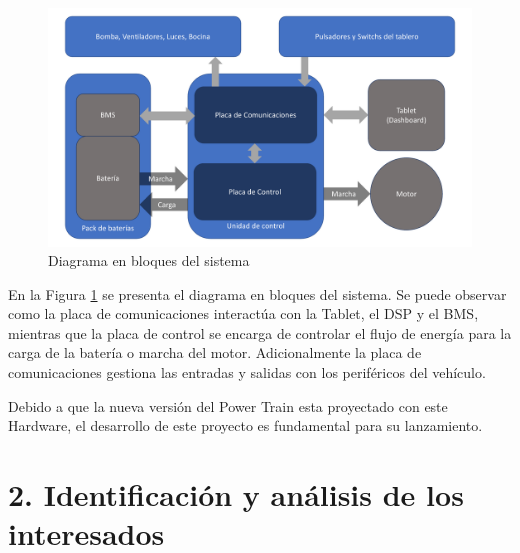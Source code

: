 \documentclass[
11pt, %
codirector, %
]{charter}
\begin{document}

\begin{figure}[htpb]
	\centering
	\includegraphics[width=.9\textwidth]{./Figuras/EsquematicoPT.pdf}
	\caption{Diagrama en bloques del sistema}
	\label{fig:diagBloques}
\end{figure}

\vspace{25px}

En la Figura \ref{fig:diagBloques} se presenta el diagrama en bloques del sistema. Se puede observar como la placa de comunicaciones interactúa con la Tablet, el DSP y el BMS, mientras que la placa de control se encarga de controlar el flujo de energía para la carga de la batería o marcha del motor. Adicionalmente la placa de comunicaciones gestiona las entradas y salidas con los periféricos del vehículo.

Debido a que la nueva versión del Power Train esta proyectado con este Hardware, el desarrollo de este proyecto es fundamental para su lanzamiento.

\section{2. Identificación y análisis de los interesados}
\label{sec:interesados}
\end{document}
